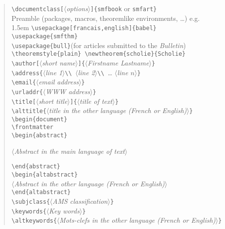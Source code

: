 \documentclass[10 pt,english]{smfart}
\def\meta#1{$\langle${\it #1}$\rangle$}
\begin{document}
\begin{verse}
\verb|\documentclass[|\meta{options}\verb|]{smfbook| or \verb|smfart}|\\
Preamble (packages, macros, theoremlike environments, \ldots) e.g.\\
{\advance\leftskip 1.5em
\verb|\usepackage[francais,english]{babel}| \\
\verb|\usepackage{smfthm}|\\
\verb|\usepackage{bull}|\quad (for articles submitted to the \textsl{Bulletin})\\
\verb|\theoremstyle{plain} \newtheorem{scholie}{Scholie}|\\
}
\smallskip
\verb|\author[|\meta{short name}\verb|]{|\meta{Firstname Lastname}\verb|}| \\
\verb|\address{|\meta{line 1}\verb|\\ |\meta{line 2}\verb|\\ |\dots
\meta{line $n$}\verb|}| \\
\verb|\email{|\meta{email address}\verb|}| \\
\verb|\urladdr{|\meta{WWW address}\verb|}|\\
\smallskip
\verb|\title[|\meta{short title}\verb|]{|\meta{title of text}\verb|}| \\
\verb|\alttitle{|\meta{title in the other language
    (French or English)}\verb|}| \\
\smallskip
\verb|\begin{document}|\\
\verb|\frontmatter|\\
\smallskip
\verb|\begin{abstract}|\par\nopagebreak\noindent
\quad\meta{Abstract in the main language of text}\par\nopagebreak\noindent
\verb|\end{abstract}|\\ \smallskip 
\verb|\begin{altabstract}|\\
\quad\meta{Abstract in the other language (French or English)}\\
\verb|\end{altabstract}| \\
\smallskip
\verb|\subjclass{|\meta{AMS classification}\verb|}| \\
\verb|\keywords{|\meta{Key words}\verb|}| \\
\verb|\altkeywords{|\meta{Mots-clefs in the other language (French or English)}\verb|}| \\

\end{verse}
\end{document}
